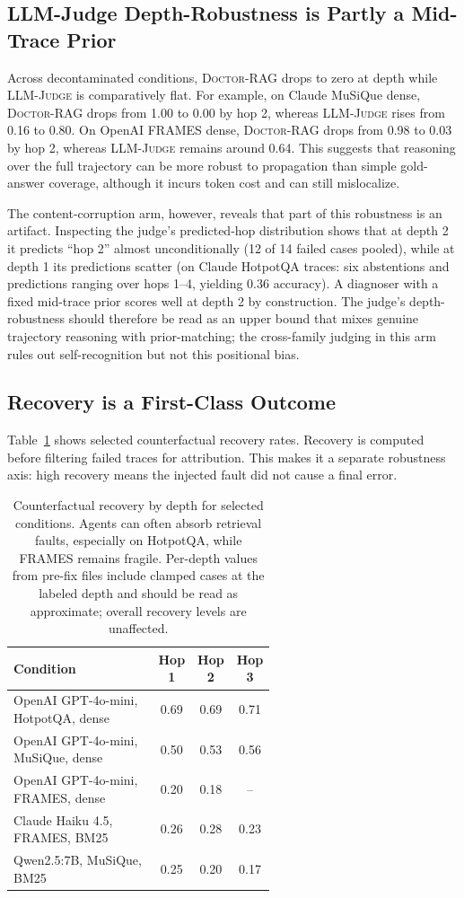 \documentclass[11pt]{article}
\newcommand{\dr}{\textnormal{\textsc{Doctor-RAG}}}
\newcommand{\lj}{\textnormal{\textsc{LLM-Judge}}}
\begin{document}
\subsection{LLM-Judge Depth-Robustness is Partly a Mid-Trace Prior}
\label{sec:judge-robust}

Across decontaminated conditions, \dr{} drops to zero at depth while \lj{} is
comparatively flat.  For example, on Claude MuSiQue dense, \dr{} drops from
1.00 to 0.00 by hop 2, whereas \lj{} rises from 0.16 to 0.80.  On OpenAI
FRAMES dense, \dr{} drops from 0.98 to 0.03 by hop 2, whereas \lj{} remains
around 0.64.  This suggests that reasoning over the full trajectory can be
more robust to propagation than simple gold-answer coverage, although it
incurs token cost and can still mislocalize.

The content-corruption arm, however, reveals that part of this robustness is an
artifact.  Inspecting the judge's predicted-hop distribution shows that at
depth 2 it predicts ``hop 2'' almost unconditionally (12 of 14 failed cases
pooled), while at depth 1 its predictions scatter (on Claude HotpotQA traces:
six abstentions and predictions ranging over hops 1--4, yielding 0.36
accuracy).  A diagnoser with a fixed mid-trace prior scores well at depth 2 by
construction.  The judge's depth-robustness should therefore be read as an
upper bound that mixes genuine trajectory reasoning with prior-matching; the
cross-family judging in this arm rules out self-recognition but not this
positional bias.

\subsection{Recovery is a First-Class Outcome}

Table~\ref{tab:recovery} shows selected counterfactual recovery rates.  Recovery
is computed before filtering failed traces for attribution.  This makes it a
separate robustness axis: high recovery means the injected fault did not cause a
final error.

\begin{table}[t]
\centering
\small
\begin{tabular}{p{0.58\linewidth}ccc}
\toprule
Condition & Hop 1 & Hop 2 & Hop 3 \\
\midrule
OpenAI GPT-4o-mini, HotpotQA, dense & 0.69 & 0.69 & 0.71 \\
OpenAI GPT-4o-mini, MuSiQue, dense & 0.50 & 0.53 & 0.56 \\
OpenAI GPT-4o-mini, FRAMES, dense & 0.20 & 0.18 & -- \\
Claude Haiku 4.5, FRAMES, BM25 & 0.26 & 0.28 & 0.23 \\
Qwen2.5:7B, MuSiQue, BM25 & 0.25 & 0.20 & 0.17 \\
\bottomrule
\end{tabular}
\caption{Counterfactual recovery by depth for selected conditions.  Agents can
often absorb retrieval faults, especially on HotpotQA, while FRAMES remains
fragile.  Per-depth values from pre-fix files include clamped cases at the
labeled depth and should be read as approximate; overall recovery levels are
unaffected.}
\label{tab:recovery}
\end{table}
\end{document}
